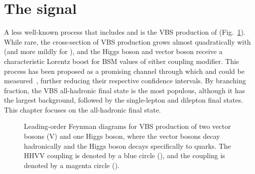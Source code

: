 \section{The signal}
A less well-known process that includes \kVV and \kHHH is the VBS production of \HVV (Fig.~\ref{fig:vbsvvh_feynman_allhad}). 
While rare, the cross-section of VBS \HVV production grows almost quadratically with \kVV (and more mildly for \kHHH), and the Higgs boson and vector boson receive a characteristic Lorentz boost for BSM values of either coupling modifier. 
This process has been proposed as a promising channel through which \kVV and \kHHH could be measured~\cite{HiggsWithoutHiggs}, further reducing their respective confidence intervals. 
By branching fraction, the VBS \HVV all-hadronic final state is the most populous, although it has the largest background, followed by the single-lepton and dilepton final states. 
This chapter focuses on the all-hadronic final state. 
\begin{figure}[htb]
    \centering
    \quad
    \caption[Leading-order Feynman diagrams for VBS \VVH in the all-hadronic final state]{
        Leading-order Feynman diagrams for VBS production of two vector bosons (V) and one Higgs boson, where the vector bosons decay hadronically and the Higgs boson decays specifically to \PQb quarks. 
        The HHVV coupling \kVV is denoted by a blue circle (\textcolor{blue}{}), and the \HHH coupling \kHHH is denoted by a magenta circle (\textcolor{magenta}{}). 
    }
    \label{fig:vbsvvh_feynman_allhad}
\end{figure}

